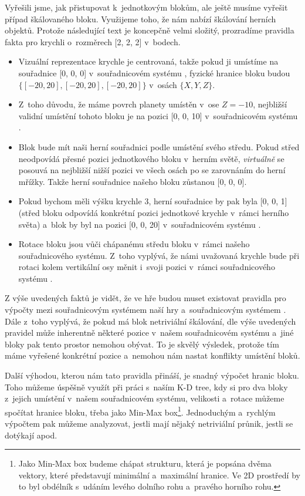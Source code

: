 Vyřešili jsme, jak přistupovat k~jednotkovým blokům, ale ještě musíme vyřešit případ škálovaného bloku. Využijeme toho, že \UE{} nám nabízí škálování herních objektů. Protože následující text je koncepčně velmi složitý, prozradíme pravidla fakta pro krychli o~rozměrech [2, 2, 2] v~bodech.

\begin{itemize}
	\item Vizuální reprezentace krychle je centrovaná, takže pokud ji umístíme na souřadnice [0, 0, 0] v~souřadnicovém systému \UEu{}, fyzické hranice bloku budou $\{ [-20, 20], [-20, 20], [-20, 20]\}$ v~osách $\{X, Y, Z\}$.
	\item Z~toho důvodu, že máme povrch planety umístěn v~ose $Z = -10$, nejbližší validní umístění tohoto bloku je na pozici [0, 0, 10] v~souřadnicovém systému \UEu{}.
	\item Blok bude mít naši herní souřadnici podle umístění svého středu. Pokud střed neodpovídá přesné pozici jednotkového bloku v~herním světě, \textit{virtuálně} se posouvá na nejbližší nižší pozici ve všech osách po se zarovnáním do herní mřížky. Takže herní souřadnice našeho bloku zůstanou [0, 0, 0]. 
	\item Pokud bychom měli výšku krychle 3, herní souřadnice by pak byla [0, 0, 1] (střed bloku odpovídá konkrétní pozici jednotkové krychle v~rámci herního světa) a~blok by byl na pozici [0, 0, 20] v~souřadnicovém systému \UEu{}.
	\item Rotace bloku jsou vůči chápanému středu bloku v~rámci našeho souřadnicového systému. Z~toho vyplývá, že námi uvažovaná krychle bude při rotaci kolem vertikální osy měnit i~svoji pozici v~rámci souřadnicového systému \UEu{}.
\end{itemize}

Z výše uvedených faktů je vidět, že ve hře budou muset existovat pravidla pro výpočty mezi souřadnicovým systémem naší hry a~souřadnicovým systémem \UEu{}. Dále z~toho vyplývá, že pokud má blok netriviální škálování, dle výše uvedených pravidel může inherentně  některé pozice v~našem souřadnicovém systému a~jiné bloky pak tento prostor nemohou obývat. To je skvělý výsledek, protože tím máme vyřešené konkrétní pozice a~nemohou nám nastat konflikty umístění bloků.

Další výhodou, kterou nám tato pravidla přináší, je snadný výpočet hranic bloku. Toho můžeme úspěšně využít při práci s~naším K-D tree, kdy si pro dva bloky z~jejich umístění v~našem souřadnicovém systému, velikosti a~rotace můžeme spočítat hranice bloku, třeba jako Min-Max box\footnote{Jako Min-Max box budeme chápat strukturu, která je popsána dvěma vektory, které představují minimální a~maximální hranice. Ve 2D prostředí by to byl obdélník s~udáním levého dolního rohu a~pravého horního rohu.}. Jednoduchým a~rychlým výpočtem pak můžeme analyzovat, jestli mají nějaký netriviální průnik, jestli se dotýkají apod.

